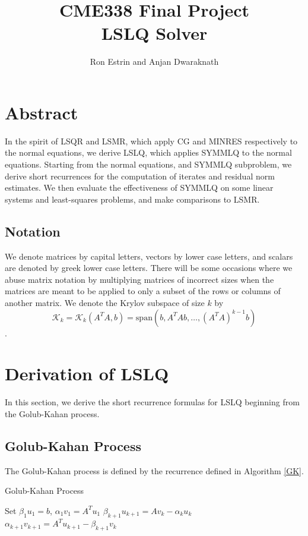 \documentclass[11pt]{article}
\newcommand{\KK}{\mathcal{K}_k}
\begin{document}
\title{CME338 Final Project\\
LSLQ Solver }
\author{Ron Estrin and Anjan Dwaraknath}
\date{}
\maketitle

\section{Abstract}
In the spirit of LSQR and LSMR, which apply CG and MINRES respectively to the normal equations, we derive LSLQ, which applies SYMMLQ to the normal equations. Starting from the normal equations, and SYMMLQ subproblem, we derive short recurrences for the computation of iterates and residual norm estimates. We then evaluate the effectiveness of SYMMLQ on some linear systems and least-squares problems, and make comparisons to LSMR.

\subsection{Notation}
We denote matrices by capital letters, vectors by lower case letters, and scalars are denoted by greek lower case letters. There will be some occasions where we abuse matrix notation by multiplying matrices of incorrect sizes when the matrices are meant to be applied to only a subset of the rows or columns of another matrix.
We denote the Krylov subspace of size $k$ by 
$$\KK = \KK (A^T A, b) = \mathrm{span}\left(b, A^T A b, \dots, (A^T A)^{k-1} b \right)$$.

\section{Derivation of LSLQ}
In this section, we derive the short recurrence formulas for LSLQ beginning from the Golub-Kahan process.

\subsection{Golub-Kahan Process}
The Golub-Kahan process is defined by the recurrence defined in Algorithm \ref{GK}.

\begin{algorithm}
\caption{Golub-Kahan Process}
\label{GK}
\begin{algorithmic}
	\State Set $\beta_1 u_1 = b$, $\alpha_1 v_1 = A^T u_1$
		\State $\beta_{k+1} u_{k+1} = A v_k - \alpha_k u_k$
		\State $\alpha_{k+1} v_{k+1} = A^T u_{k+1} - \beta_{k+1} v_k$
	\EndFor
\end{algorithmic}
\end{algorithm}
\end{document}

